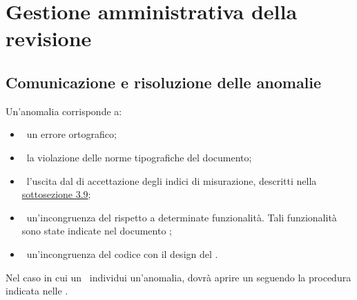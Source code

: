 
\section{Gestione amministrativa della revisione}
	\label{sec:4}
	\subsection{Comunicazione e risoluzione delle anomalie}
		Un'anomalia corrisponde a:
		\begin{itemize}
			\item\ un errore ortografico;
			\item\ la violazione delle norme tipografiche del documento;
			\item\ l'uscita dal  di accettazione degli indici di misurazione, descritti nella \hyperref[sec:3.9]{sottosezione 3.9};
			\item\ un'incongruenza del  rispetto a determinate funzionalità. Tali funzionalità sono state indicate nel documento \ARdoc;
			\item\ un'incongruenza del codice con il design del .
		\end{itemize}
		Nel caso in cui un \VER\ individui un'anomalia, dovrà aprire un  seguendo la procedura indicata nelle \NPdoc.